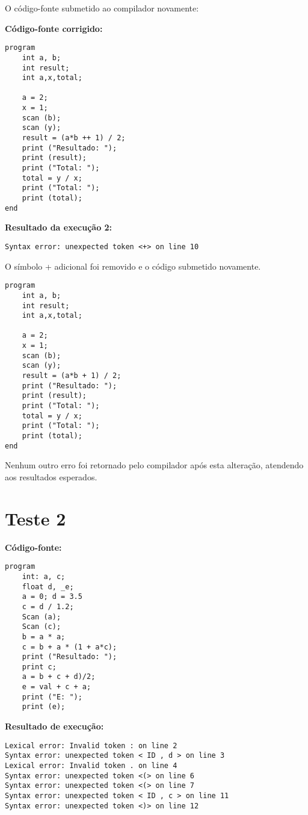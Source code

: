 O código-fonte submetido ao compilador novamente:

\textbf{Código-fonte corrigido:}
\begin{lstlisting}
program
	int a, b;
	int result;
	int a,x,total;

	a = 2;
	x = 1;
	scan (b);
	scan (y);
	result = (a*b ++ 1) / 2;
	print ("Resultado: ");
	print (result);
	print ("Total: ");
	total = y / x;
	print ("Total: ");
	print (total);
end
\end{lstlisting}

\textbf{Resultado da execução 2:}
\begin{lstlisting}
Syntax error: unexpected token <+> on line 10
\end{lstlisting}

O símbolo + adicional foi removido e o código submetido novamente.
\newpage
\begin{lstlisting}
program
	int a, b;
	int result;
	int a,x,total;

	a = 2;
	x = 1;
	scan (b);
	scan (y);
	result = (a*b + 1) / 2;
	print ("Resultado: ");
	print (result);
	print ("Total: ");
	total = y / x;
	print ("Total: ");
	print (total);
end
\end{lstlisting}

Nenhum outro erro foi retornado pelo compilador após esta alteração, atendendo aos resultados esperados.
    
\section{\textbf{Teste 2}}
    
\textbf{Código-fonte:}

\begin{lstlisting}
program
	int: a, c;
	float d, _e;
	a = 0; d = 3.5
	c = d / 1.2;
	Scan (a);
	Scan (c);
	b = a * a;
	c = b + a * (1 + a*c);
	print ("Resultado: ");
	print c;
	a = b + c + d)/2;
	e = val + c + a;
	print ("E: ");
	print (e);
\end{lstlisting}

\textbf{Resultado de execução:}
        
        
 \begin{lstlisting}
Lexical error: Invalid token : on line 2
Syntax error: unexpected token < ID , d > on line 3
Lexical error: Invalid token . on line 4
Syntax error: unexpected token <(> on line 6
Syntax error: unexpected token <(> on line 7
Syntax error: unexpected token < ID , c > on line 11
Syntax error: unexpected token <)> on line 12
\end{lstlisting}

